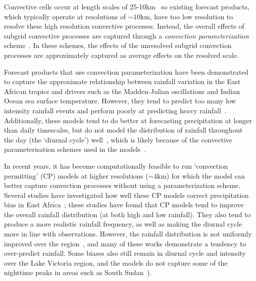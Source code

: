 \documentclass[../main.tex]{subfiles}
\begin{document}
Convective cells occur at length scales of 25-10km~\citep{barry_atmosphere_2009, stensrud_convective_2013, bryan_resolution_2003} so existing forecast products, which typically operate at resolutions of $\sim10\text{km}$, have too low resolution to resolve these high resolution convective processes. Instead, the overall effects of subgrid convective processes are captured through a \emph{convection parameterization} scheme~\citep{stensrud_convective_2013}. In these schemes, the effects of the unresolved subgrid convection processes are approximately captured as average effects on the resolved scale.


Forecast products that use convection parameterization have been demonstrated to capture the approximate relationship between rainfall variation in the East African tropics and drivers such as the Madden-Julian oscillations and Indian Ocean sea surface temperature. However, they tend to predict too many low intensity rainfall events and perform poorly at predicting heavy rainfall~\citep{woodhams_what_2018, chamberlain_forecasting_2014, vogel_skill_2018, walker_skill_2019, bechtold_representing_2014, haiden_intercomparison_2012}. Additionally, these models tend to do better at forecasting precipitation at longer than daily timescales, but do not model the distribution of rainfall throughout the day (the `diurnal cycle') well~\citep{kim_tropical_2013, macleod_drivers_2021, bechtold_simulation_2004}, which is likely because of the convective parameterisation schemes used in the models~\citep{vogel_skill_2018, marsham_role_2013, bechtold_representing_2014}. 

In recent years, it has become computationally feasible to run `convection permitting' (CP) models at higher resolutions ($\sim4\text{km}$) for which the model can better capture convection processes without using a parameterization scheme. Several studies have investigated how well these CP models correct precipitation bias in East Africa~\citep{finney_implications_2019, cafaro_convection-permitting_2021, woodhams_what_2018, chamberlain_forecasting_2014, kendon_enhanced_2019, senior_convection-permitting_2021}; these studies have found that CP models tend to improve the overall rainfall distribution (at both high and low rainfall). They also tend to produce a more realistic rainfall frequency, as well as making the diurnal cycle more in line with observations. However, the rainfall distribution is not uniformly improved over the region~\citep{senior_convection-permitting_2021}, and many of these works demonstrate a tendency to over-predict rainfall. Some biases also still remain in diurnal cycle and intensity over the Lake Victoria region, and the models do not capture some of the nighttime peaks in areas such as South Sudan~\citep{finney_implications_2019, chamberlain_forecasting_2014}). 
\end{document}
